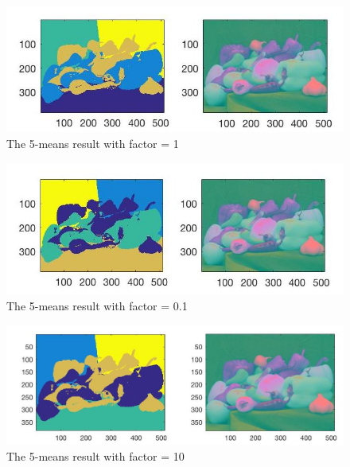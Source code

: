 \documentclass{article}
\begin{document}
\begin{figure}[htbp]
    \centering
    \includegraphics[scale = 0.4]{fig7.jpg}
    \caption{The 5-means result with factor = 1}
    \label{fig8}
\end{figure}

\begin{figure}[htbp]
    \centering
    \includegraphics[scale = 0.4]{fig9.jpg}
    \caption{The 5-means result with factor = 0.1}
    \label{fig9}
\end{figure}

\begin{figure}[htbp]
    \centering
    \includegraphics[scale = 0.25]{fig10.jpg}
    \caption{The 5-means result with factor = 10}
    \label{fig10}
\end{figure}
\end{document}
